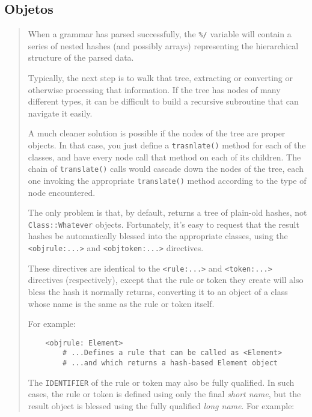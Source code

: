 \subsection{Objetos}

\begin{it}\begin{quotation}
When a grammar has parsed successfully, the \verb|%/| variable will contain
a series of nested hashes (and possibly arrays) representing the
hierarchical structure of the parsed data.

Typically, the next step is to walk that tree, extracting or converting
or otherwise processing that information. If the tree has nodes of many
different types, it can be difficult to build a recursive subroutine
that can navigate it easily.

A much cleaner solution is possible if the nodes of the tree are proper
objects. In that case, you just define a \verb|trasnlate()| method
for each of the classes, and have every node call that method on each
of its children.  The chain of \verb|translate()| calls would cascade down the
nodes of the tree, each one invoking the appropriate \verb|translate()| method
according to the type of node encountered.

The only problem is that, by default,  returns a tree
of plain-old hashes, not \verb|Class::Whatever| objects. Fortunately, it's
easy to request that the result hashes be automatically blessed into
the appropriate classes, using the \verb|<objrule:...>| and \verb|<objtoken:...>|
directives.

These directives are identical to the \verb|<rule:...>| and \verb|<token:...>|
directives (respectively), except that the rule or token they create will
also bless the hash it normally returns, converting it to an object of
a class whose name is the same as the rule or token itself.

For example:

\begin{verbatim}
    <objrule: Element>
        # ...Defines a rule that can be called as <Element>
        # ...and which returns a hash-based Element object
\end{verbatim}

The \verb|IDENTIFIER| of the rule or token may also be fully qualified. In
such cases, the rule or token is defined using only the final \emph{short
name}, but the result object is blessed using the fully qualified \emph{long
name}. For example:


\end{quotation}
\end{it}
